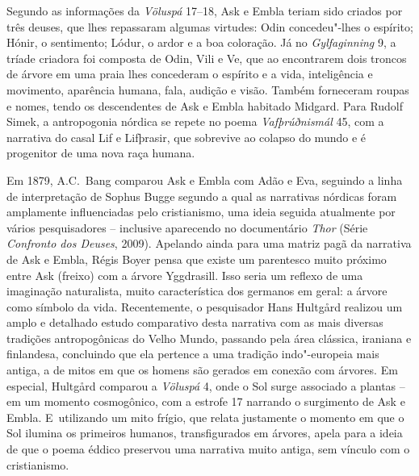 
Segundo as informações da \emph{Völuspá} 17--18, Ask e Embla teriam sido
criados por três deuses, que lhes repassaram algumas virtudes: Odin
concedeu"-lhes o espírito; Hónir, o sentimento; Lódur, o ardor e a boa
coloração. Já no \emph{Gylfaginning} 9, a tríade criadora foi composta
de Odin, Vili e Ve, que ao encontrarem dois troncos de árvore em uma
praia lhes concederam o espírito e a vida, inteligência e movimento,
aparência humana, fala, audição e visão. Também forneceram roupas e
nomes, tendo os descendentes de Ask e Embla habitado Midgard. Para
Rudolf Simek, a antropogonia nórdica se repete no poema
\emph{Vafþrúðnismál} 45, com a narrativa do casal Lif e Lifþrasir, que
sobrevive ao colapso do mundo e é progenitor de uma nova raça humana.

Em 1879, A.C.~Bang comparou Ask e Embla com Adão e Eva, seguindo a linha
de interpretação de Sophus Bugge segundo a qual as narrativas nórdicas
foram amplamente influenciadas pelo cristianismo, uma ideia seguida
atualmente por vários pesquisadores -- inclusive aparecendo no
documentário \emph{Thor} (Série \emph{Confronto dos Deuses}, 2009).
Apelando ainda para uma matriz pagã da narrativa de Ask e Embla, Régis
Boyer pensa que existe um parentesco muito próximo entre Ask (freixo)
com a árvore Yggdrasill. Isso seria um reflexo de uma imaginação
naturalista, muito característica dos germanos em geral: a árvore como
símbolo da vida. Recentemente, o pesquisador Hans Hultgård realizou um
amplo e detalhado estudo comparativo desta narrativa com as mais
diversas tradições antropogônicas do Velho Mundo, passando pela área
clássica, iraniana e finlandesa, concluindo que ela pertence a uma
tradição indo"-europeia mais antiga, a de mitos em que os homens são
gerados em conexão com árvores. Em especial, Hultgård comparou a
\emph{Völuspá} 4, onde o Sol surge associado a plantas -- em um momento
cosmogônico, com a estrofe 17 narrando o surgimento de Ask e Embla. E~utilizando 
um mito frígio, que relata justamente o momento em que o Sol
ilumina os primeiros humanos, transfigurados em árvores, apela para a
ideia de que o poema éddico preservou uma narrativa muito antiga, sem
vínculo com o cristianismo.

